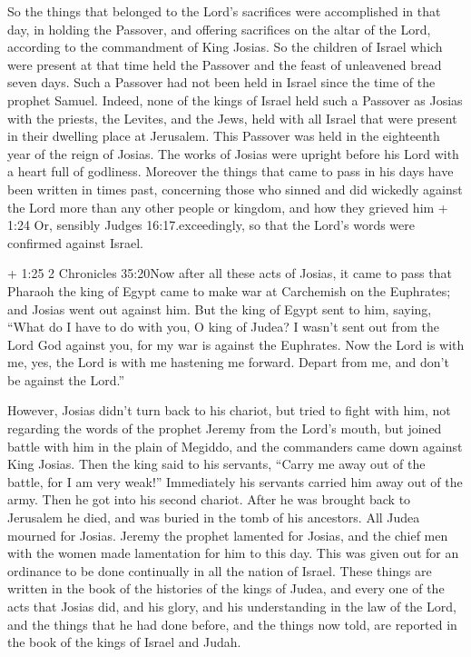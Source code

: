 So the things that belonged to the Lord's sacrifices were
accomplished in that day, in holding the Passover,  and
offering sacrifices on the altar of the Lord, according to the
commandment of King Josias.  So the children of Israel
which were present at that time held the Passover and the feast of
unleavened bread seven days.  Such a Passover had not been
held in Israel since the time of the prophet Samuel. 
Indeed, none of the kings of Israel held such a Passover as Josias with
the priests, the Levites, and the Jews, held with all Israel that were
present in their dwelling place at Jerusalem.  This
Passover was held in the eighteenth year of the reign of Josias.
 The works of Josias were upright before his Lord with a
heart full of godliness.  Moreover the things that came to
pass in his days have been written in times past, concerning those who
sinned and did wickedly against the Lord more than any other people or
kingdom, and how they grieved him + 1:24 Or, sensibly Judges
16:17.exceedingly, so that the Lord's words were confirmed against
Israel.

 + 1:25 2 Chronicles 35:20Now after all these acts of
Josias, it came to pass that Pharaoh the king of Egypt came to make war
at Carchemish on the Euphrates; and Josias went out against him.
 But the king of Egypt sent to him, saying, ``What do I
have to do with you, O king of Judea?  I wasn't sent out
from the Lord God against you, for my war is against the Euphrates. Now
the Lord is with me, yes, the Lord is with me hastening me forward.
Depart from me, and don't be against the Lord.''

 However, Josias didn't turn back to his chariot, but tried
to fight with him, not regarding the words of the prophet Jeremy from
the Lord's mouth,  but joined battle with him in the plain
of Megiddo, and the commanders came down against King Josias.
 Then the king said to his servants, ``Carry me away out of
the battle, for I am very weak!'' Immediately his servants carried him
away out of the army.  Then he got into his second chariot.
After he was brought back to Jerusalem he died, and was buried in the
tomb of his ancestors.  All Judea mourned for Josias.
Jeremy the prophet lamented for Josias, and the chief men with the women
made lamentation for him to this day. This was given out for an
ordinance to be done continually in all the nation of Israel.
 These things are written in the book of the histories of
the kings of Judea, and every one of the acts that Josias did, and his
glory, and his understanding in the law of the Lord, and the things that
he had done before, and the things now told, are reported in the book of
the kings of Israel and Judah.

